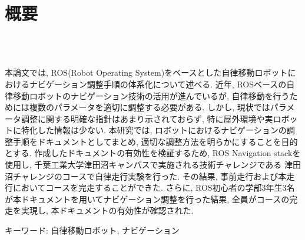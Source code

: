 \chapter*{概要}
\thispagestyle{empty}
%
\begin{center}
  \scalebox{1.5}{ROSベースの自律移動ロボットにおける}\\
  \scalebox{1.5}{ナビゲーション調整手順の体系化}\\
\end{center}
\vspace{1.0zh}
%

本論文では, ROS(Robot Operating System)をベースとした自律移動ロボットにおけるナビゲーション調整手順の体系化について述べる. 
近年, ROSベースの自律移動ロボットのナビゲーション技術の活用が進んでいるが, 自律移動を行うためには複数のパラメータを適切に調整する必要がある. 
しかし, 現状ではパラメータ調整に関する明確な指針はあまり示されておらず, 特に屋外環境や実ロボットに特化した情報は少ない. 
本研究では, ロボットにおけるナビゲーションの調整手順をドキュメントとしてまとめ, 適切な調整方法を明らかにすることを目的とする. 
作成したドキュメントの有効性を検証するため, ROS Navigation stackを使用し, 千葉工業大学津田沼キャンパスで実施される技術チャレンジである
津田沼チャレンジのコースで自律走行実験を行った. その結果, 事前走行および本走行においてコースを完走することができた. 
さらに, ROS初心者の学部3年生3名が本ドキュメントを用いてナビゲーション調整を行った結果, 全員がコースの完走を実現し, 本ドキュメントの有効性が確認された. 

\vspace{1.0zh}

キーワード: 自律移動ロボット, ナビゲーション
%
\newpage
